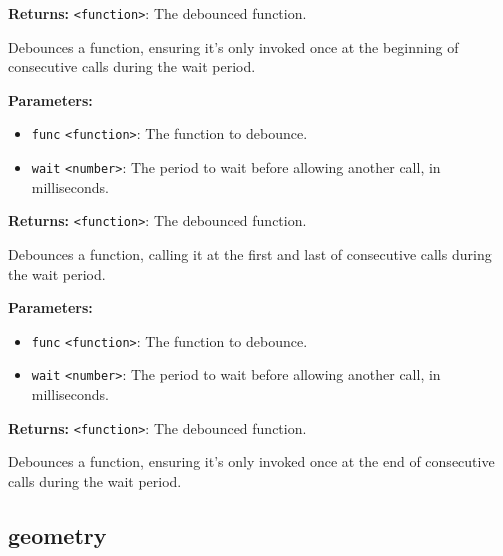\documentclass[12pt,a4paper]{article}
\begin{document}
\noindent \textbf{Returns:} \texttt{<function>}: The debounced function.

\noindent Debounces a function, ensuring it's only invoked once at the beginning of consecutive calls during the wait period.

\vspace{5mm}
\noindent {}


\noindent \textbf{Parameters:}
\begin{itemize}
  \item \texttt{func} \texttt{<function>}: The function to debounce.
  \item \texttt{wait} \texttt{<number>}: The period to wait before allowing another call, in milliseconds.
\end{itemize}

\noindent \textbf{Returns:} \texttt{<function>}: The debounced function.

\noindent Debounces a function, calling it at the first and last of consecutive calls during the wait period.

\vspace{5mm}
\noindent {}


\noindent \textbf{Parameters:}
\begin{itemize}
  \item \texttt{func} \texttt{<function>}: The function to debounce.
  \item \texttt{wait} \texttt{<number>}: The period to wait before allowing another call, in milliseconds.
\end{itemize}

\noindent \textbf{Returns:} \texttt{<function>}: The debounced function.

\noindent Debounces a function, ensuring it's only invoked once at the end of consecutive calls during the wait period.


\subsection{geometry}
\vspace{5mm}
\noindent {}
\end{document}
